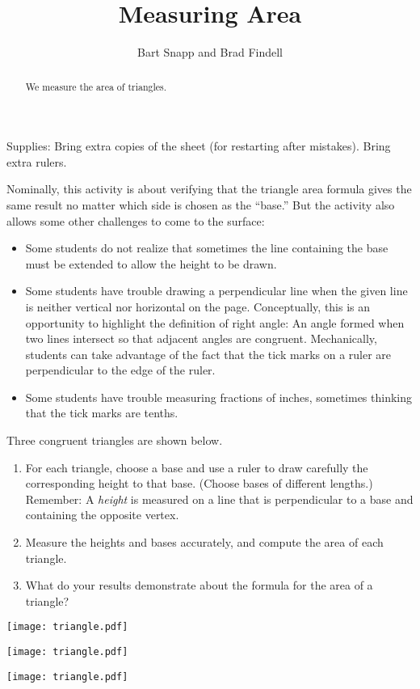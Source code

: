 \documentclass[nooutcomes]{ximera}
\title{Measuring Area}
\author{Bart Snapp and Brad Findell}
\begin{document}
\begin{abstract}
  We measure the area of triangles.
\end{abstract}
\maketitle


\begin{teachingnote}
Supplies: Bring extra copies of the sheet (for restarting after mistakes).  Bring extra rulers. 

Nominally, this activity is about verifying that the triangle area formula gives the same result no matter which
side is chosen as the ``base.''  But the activity also allows some other challenges to come to the surface:  
\begin{itemize}
\item Some students do not realize that sometimes the line containing the base must be 
extended to allow the height to be drawn. 
\item Some students have trouble drawing a perpendicular line when the given line is neither vertical nor 
horizontal on the page.  Conceptually, this is an opportunity to highlight the definition of right angle:  An angle formed when two lines intersect so that adjacent angles are congruent.  Mechanically, students can take advantage of the fact that the tick marks on 
a ruler are perpendicular to the edge of the ruler.  
\item Some students have trouble measuring fractions of inches, sometimes thinking that the tick marks are tenths.  
\end{itemize}
\end{teachingnote}


\begin{problem}
Three congruent triangles are shown below.   
\begin{enumerate}
\item For each triangle, choose a base and use a ruler to draw carefully the corresponding height to that base.  (Choose bases of different lengths.)  Remember:  A \emph{height} is measured on a line that is perpendicular to a base and containing the opposite vertex. 
\item Measure the heights and bases accurately, and compute the area of each triangle.  
\item What do your results demonstrate about the formula for the area of a triangle?  
\end{enumerate}

\begin{image}
\texttt{[image: triangle.pdf]}
\end{image}
\begin{image}
\texttt{[image: triangle.pdf]}
\end{image}
\begin{image}
\texttt{[image: triangle.pdf]}
\end{image}

\end{problem}
\end{document}

